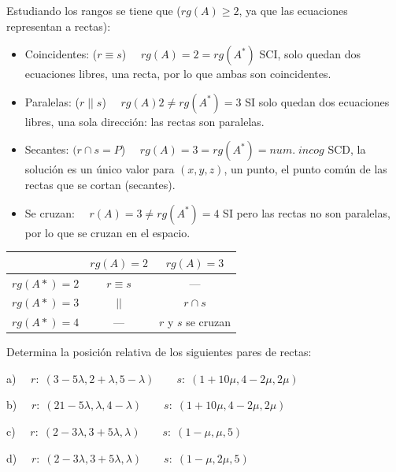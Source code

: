 \noindent Estudiando los rangos se tiene que ($rg(A)\ge 2$, ya que las ecuaciones representan a rectas):
 
\begin{itemize}
\item Coincidentes: ($r\equiv s$) $\quad rg(A)=2=rg(A^*)$ SCI, solo quedan dos ecuaciones libres, una recta, por lo que ambas son coincidentes.

\item Paralelas: ($r \;||\; s$) $\quad rg(A) 2 \neq rg(A^*)=3$ SI solo quedan dos ecuaciones libres, una sola dirección: las rectas son paralelas.

\item Secantes: $(r\cap s=P$) $\quad rg(A)=3=rg(A^*)=num. \; incog$ SCD, la solución es un único valor para $(x,y,z)$, un punto, el punto común de las rectas que se cortan (secantes).

\item Se cruzan: $\quad r(A)=3 \neq rg(A^*)=4$ SI pero las rectas no son paralelas, por lo que se cruzan en el espacio.
\end{itemize}


\begin{table}[H]
\centering
\begin{tabular}{c|c|c|}
\cline{2-3}
                                 & $rg(A)=2$    & $rg(A)=3$                                \\ \hline
\multicolumn{1}{|c|}{$rg(A*)=2$} & $r \equiv s$ & ---                                      \\ \hline
\multicolumn{1}{|c|}{$rg(A*)=3$} & $\;||\;$     & $r \cap s$                               \\ \hline
\multicolumn{1}{|l|}{$rg(A*)=4$} & ---          & \multicolumn{1}{l|}{$r$ y $s$ se cruzan} \\ \hline
\end{tabular}
\end{table}


\begin{ejem} Determina la posición relativa de los siguientes pares de rectas:

a) $\quad r:\; (3-5\lambda, 2+\lambda, 5-\lambda) \qquad s:\; (1+10\mu, 4-2\mu, 2\mu)$	

b) $\quad r:\; (21-5\lambda,\lambda, 4-\lambda) \qquad s:\; (1+10\mu, 4-2\mu, 2\mu)$	

c) $\quad r:\; (2-3\lambda, 3+5\lambda, \lambda) \qquad s:\; (1-\mu, \mu, 5)$	

d) $\quad r:\; (2-3\lambda, 3+5\lambda, \lambda) \qquad s:\; (1-\mu, 2\mu, 5)$


\end{ejem}

